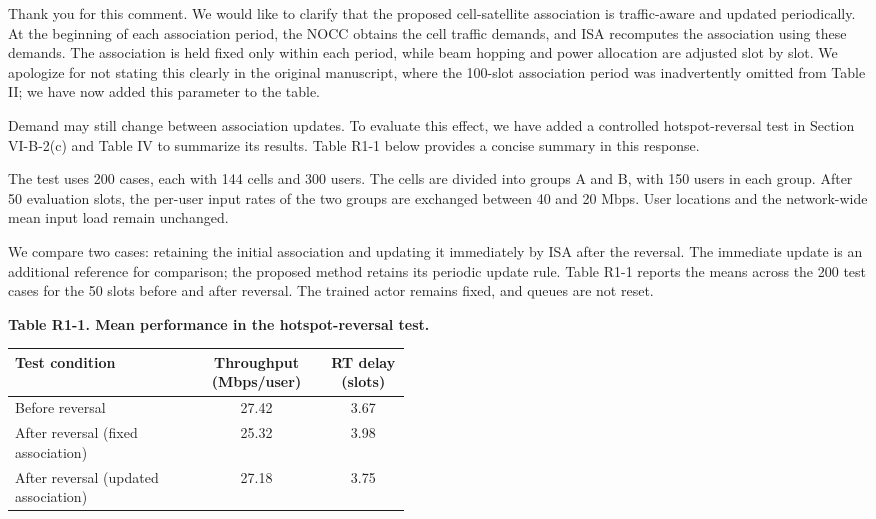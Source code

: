 \documentclass[11pt,a4paper]{article}
\newcommand{\qrev}[1]{{\color{qinrev}#1}}
\begin{document}
Thank you for this comment. We would like to clarify that the proposed cell-satellite association is traffic-aware and updated periodically. At the beginning of each association period, the NOCC obtains the cell traffic demands, and ISA recomputes the association using these demands. The association is held fixed only within each period, while beam hopping and power allocation are adjusted slot by slot. We apologize for not stating this clearly in the original manuscript, where the 100-slot association period was inadvertently omitted from Table II; we have now added this parameter to the table.
\par

Demand may still change between association updates. To evaluate this effect, we have added a controlled hotspot-reversal test in \qrev{Section VI-B-2(c)} and Table IV to summarize its results. Table R1-1 below provides a concise summary in this response.
\par

The test uses 200 cases, each with 144 cells and 300 users. The cells are divided into groups A and B, with 150 users in each group. After 50 evaluation slots, the per-user input rates of the two groups are exchanged between 40 and 20 Mbps. User locations and the network-wide mean input load remain unchanged.
\par

We compare two cases: retaining the initial association and updating it immediately by ISA after the reversal. The immediate update is an additional reference for comparison; the proposed method retains its periodic update rule. Table R1-1 reports the means across the 200 test cases for the 50 slots before and after reversal. The trained actor remains fixed, and queues are not reset.
\par

\textbf{Table R1-1. Mean performance in the hotspot-reversal test.}
\par

\begin{center}\small\renewcommand{\arraystretch}{1.2}
\begin{tabular}{@{}p{0.46\linewidth}cc@{}}\toprule
Test condition & Throughput (Mbps/user) & RT delay (slots)\\\midrule
Before reversal & 27.42 & 3.67\\
After reversal (fixed association) & 25.32 & 3.98\\
After reversal (updated association) & 27.18 & 3.75\\
\bottomrule\end{tabular}\end{center}
\end{document}
